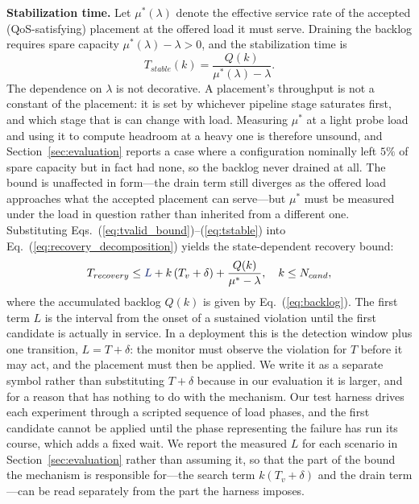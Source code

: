 \documentclass[conference]{IEEEtran}
\begin{document}
\noindent\textbf{Stabilization time.}
Let $\mu^{\ast}(\lambda)$ denote the effective service rate of the accepted (QoS-satisfying) placement \textcolor{navyblue}{at the offered load it must serve}. Draining the backlog requires spare capacity $\mu^{\ast}(\lambda) - \lambda > 0$, and the stabilization time is
\begin{equation}
T_{stable}(k) = \frac{Q(k)}{\mu^{\ast}(\lambda) - \lambda}.
\label{eq:tstable}
\end{equation}
\textcolor{navyblue}{The dependence on $\lambda$ is not decorative. A placement's throughput is not a constant of the placement: it is set by whichever pipeline stage saturates first, and which stage that is can change with load. Measuring $\mu^{\ast}$ at a light probe load and using it to compute headroom at a heavy one is therefore unsound, and Section~\ref{sec:evaluation} reports a case where a configuration nominally left $5\%$ of spare capacity but in fact had none, so the backlog never drained at all. The bound is unaffected in form---the drain term still diverges as the offered load approaches what the accepted placement can serve---but $\mu^{\ast}$ must be measured under the load in question rather than inherited from a different one.}
Substituting Eqs.~(\ref{eq:tvalid_bound})--(\ref{eq:tstable}) into Eq.~(\ref{eq:recovery_decomposition}) yields the state-dependent recovery bound:
\begin{equation}
T_{recovery} \le \textcolor{navyblue}{L} + k\,(T_v + \delta) + \frac{Q(k)}{\mu^{\ast} - \lambda}, \quad k \le N_{cand},
\label{eq:recovery_bound}
\end{equation}
where the accumulated backlog $Q(k)$ is given by Eq.~(\ref{eq:backlog}).
\textcolor{navyblue}{The first term $L$ is the interval from the onset of a sustained violation until the first candidate is actually in service. In a deployment this is the detection window plus one transition, $L = T + \delta$: the monitor must observe the violation for $T$ before it may act, and the placement must then be applied. We write it as a separate symbol rather than substituting $T+\delta$ because in our evaluation it is larger, and for a reason that has nothing to do with the mechanism. Our test harness drives each experiment through a scripted sequence of load phases, and the first candidate cannot be applied until the phase representing the failure has run its course, which adds a fixed wait. We report the measured $L$ for each scenario in Section~\ref{sec:evaluation} rather than assuming it, so that the part of the bound the mechanism is responsible for---the search term $k(T_v+\delta)$ and the drain term---can be read separately from the part the harness imposes.}
\end{document}

